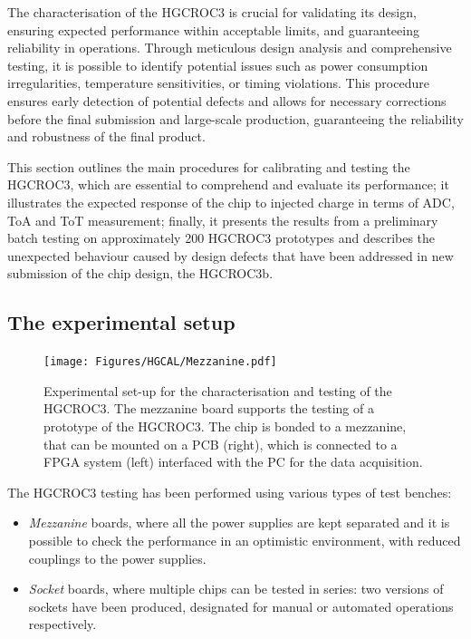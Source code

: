 The characterisation of the HGCROC3 is crucial for validating its design, ensuring expected performance within acceptable limits, and guaranteeing reliability in operations. 
Through meticulous design analysis and comprehensive testing, it is possible to identify potential issues such as power consumption irregularities, temperature sensitivities, or timing violations. This procedure ensures early detection of potential defects and allows for necessary corrections before the final submission and large-scale production, guaranteeing the reliability and robustness of the final product.

\bigbreak

This section outlines the main procedures for calibrating and testing the HGCROC3, which are essential to comprehend and evaluate its performance; it illustrates the expected response of the chip to injected charge in terms of ADC, ToA and ToT measurement; finally, it presents the results from a preliminary batch testing on approximately 200 HGCROC3 prototypes and describes the unexpected behaviour caused by design defects that have been addressed in new submission of the chip design, the HGCROC3b.

\subsection{The experimental setup}

\begin{figure}
    \centering
    \texttt{[image: Figures/HGCAL/Mezzanine.pdf]}
    \caption{Experimental set-up for the characterisation and testing of the HGCROC3. The mezzanine board  supports the testing of a prototype of the HGCROC3. The chip is bonded to a mezzanine, that can be mounted on a PCB (right), which is connected to a FPGA system (left) interfaced with the PC for the data acquisition.}
    \label{fig:Mezzanine}
\end{figure}

The HGCROC3 testing has been performed using various types of test benches:
\begin{itemize}
    \item \textit{Mezzanine} boards, where all the power supplies are kept separated and it is possible to check the performance in an optimistic environment, with reduced couplings to the power supplies.
    \item \textit{Socket} boards, where multiple chips can be tested in series: two versions of sockets have been produced, designated for manual or automated operations respectively.
\end{itemize}

